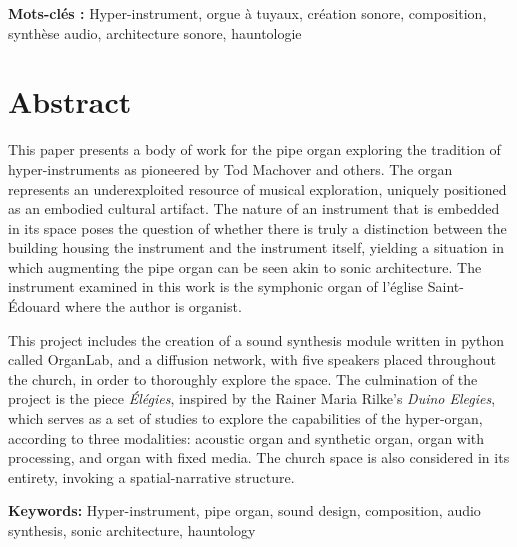 \documentclass[12pt,twoside,maitrise]{dms_ks}
\theoremstyle{definition}
\begin{document}
\textbf{Mots-clés :} Hyper-instrument, orgue à tuyaux, création sonore, composition, synthèse audio, architecture sonore, hauntologie



\anglais

\chapter*{Abstract}

This paper presents a body of work for the pipe organ exploring the tradition of hyper-instruments as pioneered by Tod Machover and others. 
The organ represents an underexploited resource of musical exploration, uniquely positioned as an embodied cultural artifact. 
The nature of an instrument that is embedded in its space poses the question of whether there is truly a distinction between the building housing the instrument and the instrument itself, yielding a situation in which augmenting the pipe organ can be seen akin to sonic architecture. 
The instrument examined in this work is the symphonic organ of l'église Saint-Édouard where the author is organist. 

This project includes the creation of a sound synthesis module written in python called OrganLab, and a diffusion network, with five speakers placed throughout the church, in order to thoroughly explore the space. 
The culmination of the project is the piece \textit{Élégies}, inspired by the Rainer Maria Rilke's \textit{Duino Elegies}, which serves as a set of studies to explore the capabilities of the hyper-organ, according to three modalities: acoustic organ and synthetic organ, organ with processing, and organ with fixed media. 
The church space is also considered in its entirety, invoking a spatial-narrative structure. 

\textbf{Keywords:} Hyper-instrument, pipe organ, sound design, composition, audio synthesis, sonic architecture, hauntology


\end{document}
